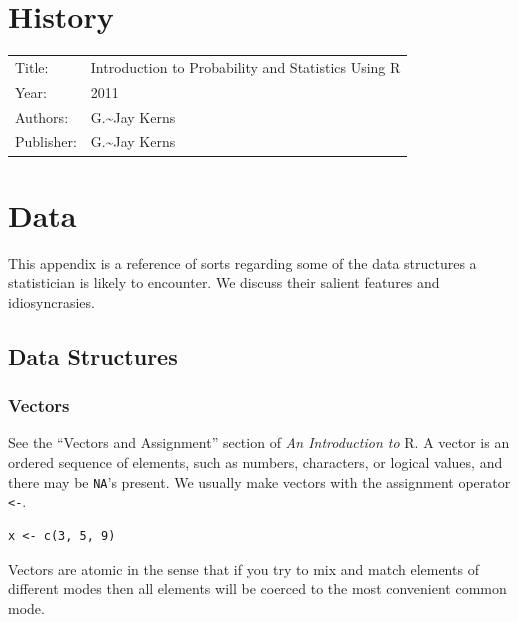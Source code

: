 \documentclass[captions=tableheading]{scrbook}
\begin{document}
\chapter{History}
\label{sec-19}

\label{cha:History}


\begin{center}
\begin{tabular}{ll}
 Title:      &  Introduction to Probability and Statistics Using \textsf{R}  \\
 Year:       &  2011                                                         \\
 Authors:    &  G.\~{}Jay Kerns                                              \\
 Publisher:  &  G.\~{}Jay Kerns                                              \\
\end{tabular}
\end{center}



\vfill{}
\chapter{Data}
\label{sec-20}

\label{cha:data}

This appendix is a reference of sorts regarding some of the data structures a statistician is likely to encounter. We discuss their salient features and idiosyncrasies.
\section{Data Structures \label{sec:Data-Structures}}
\label{sec-20-1}
\subsection{Vectors}
\label{sec-20-1-1}


See the ``Vectors and Assignment'' section of \emph{An Introduction to} \textsf{R}. A vector is an ordered sequence of elements, such as numbers, characters, or logical values, and there may be \texttt{NA}'s present. We usually make vectors with the assignment operator \texttt{<-}.


\begin{verbatim}
x <- c(3, 5, 9)
\end{verbatim}


Vectors are atomic in the sense that if you try to mix and match elements of different modes then all elements will be coerced to the most convenient common mode.
\end{document}
